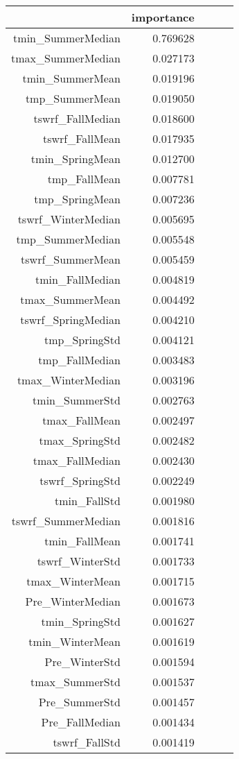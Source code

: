 \begin{tabular}{rrrrr}
\toprule
 & importance \\
\midrule
tmin_SummerMedian & 0.769628 \\
tmax_SummerMedian & 0.027173 \\
tmin_SummerMean & 0.019196 \\
tmp_SummerMean & 0.019050 \\
tswrf_FallMedian & 0.018600 \\
tswrf_FallMean & 0.017935 \\
tmin_SpringMean & 0.012700 \\
tmp_FallMean & 0.007781 \\
tmp_SpringMean & 0.007236 \\
tswrf_WinterMedian & 0.005695 \\
tmp_SummerMedian & 0.005548 \\
tswrf_SummerMean & 0.005459 \\
tmin_FallMedian & 0.004819 \\
tmax_SummerMean & 0.004492 \\
tswrf_SpringMedian & 0.004210 \\
tmp_SpringStd & 0.004121 \\
tmp_FallMedian & 0.003483 \\
tmax_WinterMedian & 0.003196 \\
tmin_SummerStd & 0.002763 \\
tmax_FallMean & 0.002497 \\
tmax_SpringStd & 0.002482 \\
tmax_FallMedian & 0.002430 \\
tswrf_SpringStd & 0.002249 \\
tmin_FallStd & 0.001980 \\
tswrf_SummerMedian & 0.001816 \\
tmin_FallMean & 0.001741 \\
tswrf_WinterStd & 0.001733 \\
tmax_WinterMean & 0.001715 \\
Pre_WinterMedian & 0.001673 \\
tmin_SpringStd & 0.001627 \\
tmin_WinterMean & 0.001619 \\
Pre_WinterStd & 0.001594 \\
tmax_SummerStd & 0.001537 \\
Pre_SummerStd & 0.001457 \\
Pre_FallMedian & 0.001434 \\
tswrf_FallStd & 0.001419 \\

\end{tabular}
